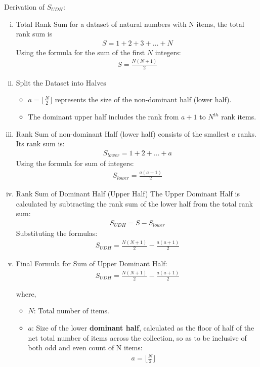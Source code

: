 \documentclass[a4paper,fleqn,review]{cas-sc}
\begin{document}
Derivation of $S_{UDH}$:
\begin{enumerate}[i.]
\item{
	Total Rank Sum for a dataset of natural numbers with N items, the total rank sum is
	\begin{align*}
		S = 1 + 2 + 3 + \ldots + N
	\end{align*}
	Using the formula for the sum of the first \( N \) integers:
	\begin{align*}
		S = \frac{N(N + 1)}{2}
	\end{align*}
}

\item{
	Split the Dataset into Halves
	\begin{itemize}
	  \item \( a = \lfloor \frac{N}{2} \rfloor \) represents the size of the non-dominant half (lower half).
	  \item The dominant upper half includes the rank from \( a + 1 \) to \(N^{th}\) rank items.
	\end{itemize}
}

\item{Rank Sum of non-dominant Half (lower half) consists of the smallest \( a \) ranks. Its rank sum is:
	\begin{align*}
		S_{lower} = 1 + 2 + \ldots + a
	\end{align*}
	Using the formula for sum of integers:
	\begin{align*}
		S_{lower} = \frac{a(a+1)}{2}
	\end{align*}
}

\item{Rank Sum of Dominant Half (Upper Half)
	The Upper Dominant Half is calculated by subtracting the rank sum of the lower half from the total rank sum:
	\begin{align*}
	S_{UDH} = S - S_{lower}
	\end{align*}
	Substituting the formulas:
	\begin{align*}
	S_{UDH} = \frac{N(N + 1)}{2} - \frac{a(a+1)}{2}
	\end{align*}
}

\item{Final Formula for Sum of Upper Dominant Half:}
\begin{align*}
S_{UDH} = \frac{N(N + 1)}{2} - \frac{a(a+1)}{2}
\label{eq:SUDH}
\end{align*}

where,
\begin{itemize}
  \item[] \( N \): Total number of items.
  \item[] \( a \): Size of the lower \textbf{dominant half}, calculated as the floor of half of the net total number of items across the collection, so as to be inclusive of both odd and even count of N items:
  \begin{align*}
  a = \lfloor \frac{N}{2} \rfloor
  \end{align*}
\end{itemize}
\end{enumerate}
\end{document}
